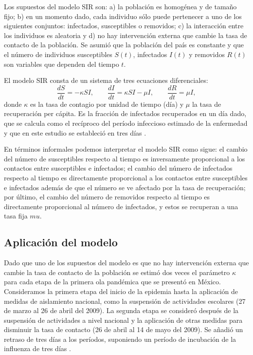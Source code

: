 \documentclass[12pt]{article}
\begin{document}
	Los supuestos del modelo SIR son: a) la población es homogénea y de tamaño fijo; b) en un momento dado, cada individuo sólo puede pertenecer a uno de los siguientes conjuntos: infectados, susceptibles o removidos; c) la interacción entre los individuos es aleatoria y d) no hay intervención externa que cambie la tasa de contacto de la población. Se asumió que la población del país es constante y que el número de individuos susceptibles $ S(t) $, infectados $ I(t) $ y removidos $ R(t) $ son variables que dependen del tiempo $ t $. 
	
	El modelo SIR consta de un sistema de tres ecuaciones diferenciales:
	\[ \frac{dS}{dt} = -\kappa S I, \qquad \frac{dI}{dt} = \kappa SI - \mu I, \qquad \frac{dR}{dt} = \mu I, \]
	donde $ \kappa $ es la tasa de contagio por unidad de tiempo (día) y $ \mu $ la tasa de recuperación per cápita. Es la fracción de infectados recuperados en un día dado, que se calcula como el recíproco del período infeccioso estimado de la enfermedad y que en este estudio se estableció en tres días \cite{Fielding2014}.
	
	En términos informales podemos interpretar el modelo SIR como sigue: el cambio del número de susceptibles respecto al tiempo es inversamente proporcional a los contactos entre susceptibles e infectados; el cambio del número de infectados respecto al tiempo es directamente proporcional a los contactos entre susceptibles e infectados además de que el número se ve afectado por la tasa de recuperación; por último, el cambio del número de removidos respecto al tiempo es directamente proporcional al número de infectados, y estos se recuperan a una tasa fija $ mu $.
	
	\subsection*{Aplicación del modelo}
	
	Dado que uno de los supuestos del modelo es que no hay intervención externa que cambie la tasa de contacto de la población se estimó dos veces el parámetro $ \kappa $ para cada etapa de la primera ola pandémica que se presentó en México. Consideramos la primera etapa del inicio de la epidemia hasta la aplicación de medidas de aislamiento nacional, como la suspensión de actividades escolares (27 de marzo al 26 de abril del 2009). La segunda etapa se consideró después de la suspensión de actividades a nivel nacional y la aplicación de otras medidas para disminuir la tasa de contacto (26 de abril al 14 de mayo del 2009). Se añadió un retraso de tres días a los períodos, suponiendo un período de incubación de la influenza de tres días \cite{Fielding2014}.
	
\end{document}
